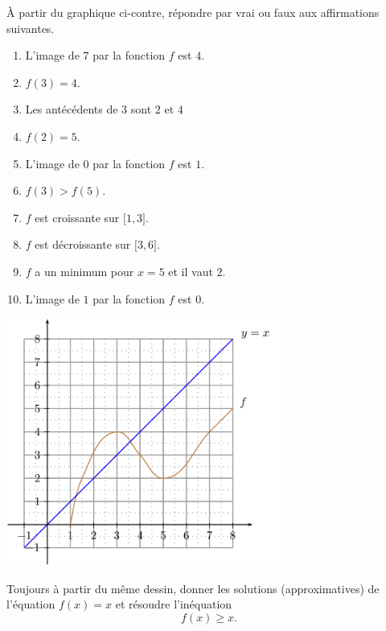 
\begin{exercice}\label{exoSeconde-0069}

    \begin{multicols}{2}

À partir du graphique ci-contre, répondre par vrai ou faux aux affirmations suivantes.

\begin{enumerate}
   \item
       L'image de \( 7\) par la fonction \( f\) est \( 4\).
   \item
       \( f(3)=4\).
   \item
       Les antécédents de \( 3\) sont \( 2\) et \( 4\)
   \item
       \( f(2)=5\).
   \item
       L'image de \( 0\) par la fonction \( f\) est \( 1\).
   \item
       \( f(3)>f(5)\).
   \item
       \( f\) est croissante sur \( \mathopen[ 1 , 3 \mathclose]\).
   \item
       \( f\) est décroissante sur \( \mathopen[ 3 , 6 \mathclose]\).
    \item
        \( f\) a un minimum pour \( x=5\) et il vaut \( 2\).
    \item
       L'image de \( 1\) par la fonction \( f\) est \( 0\).
\end{enumerate}

\columnbreak


\includegraphics[width=9.0cm]{Picture_FIGLabelFigExoIntersectionCourbenzIxXdPICTExoIntersectionCourbenzIxXd-for_eps.png}

    \end{multicols}

Toujours à partir du même dessin, donner les solutions (approximatives) de l'équation \( f(x)=x\) et résoudre l'inéquation
\begin{equation}
    f(x)\geq x.
\end{equation}


\end{exercice}
